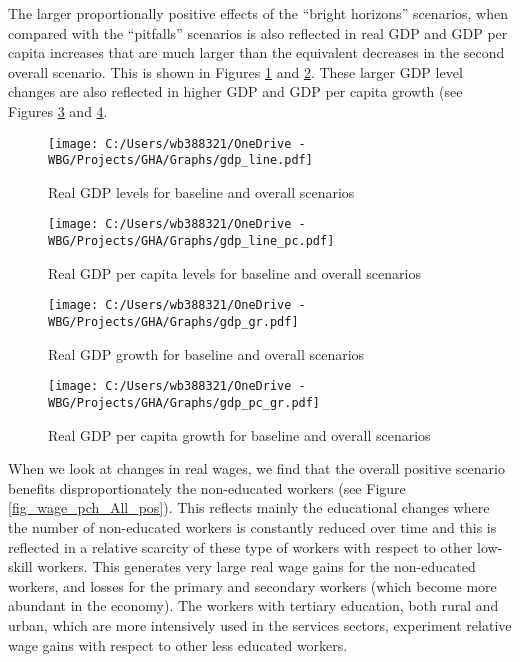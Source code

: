 \documentclass[11pt,english]{article}
\begin{document}
 \clearpage
 
 The larger proportionally positive effects of the ``bright horizons'' scenarios, when compared with the ``pitfalls'' scenarios is also reflected in real GDP and GDP per capita increases that are much larger than the equivalent decreases in the second overall scenario. This is shown in Figures \ref{fig_gdp_line} and \ref{fig_gdp_line_pc}. These larger GDP level changes are also reflected in higher GDP and GDP per capita growth  (see Figures \ref{fig_gdp_gr} and \ref{fig_gdp_pc_gr}.
 
 \begin{figure}[ht!]\caption{Real GDP levels for baseline and overall scenarios}  \label{fig_gdp_line}
	\centering
	\texttt{[image: C:/Users/wb388321/OneDrive - WBG/Projects/GHA/Graphs/gdp\_line.pdf]}
\end{figure}

\begin{figure}[ht!]\caption{Real GDP per capita levels for baseline and overall scenarios}\label{fig_gdp_line_pc}
	\centering
	\texttt{[image: C:/Users/wb388321/OneDrive - WBG/Projects/GHA/Graphs/gdp\_line\_pc.pdf]}
\end{figure}

\begin{figure}[ht!]\caption{Real GDP growth for baseline and overall scenarios}\label{fig_gdp_gr}
	\centering
	\texttt{[image: C:/Users/wb388321/OneDrive - WBG/Projects/GHA/Graphs/gdp\_gr.pdf]}
\end{figure}


\begin{figure}[ht!]\caption{Real GDP per capita growth for baseline and overall scenarios}\label{fig_gdp_pc_gr}
	\centering
	\texttt{[image: C:/Users/wb388321/OneDrive - WBG/Projects/GHA/Graphs/gdp\_pc\_gr.pdf]}
\end{figure}

\clearpage

When we look at changes in real wages, we find that the overall positive scenario benefits disproportionately the non-educated workers (see Figure \ref{fig_wage_pch_All_pos}). This reflects mainly the educational changes where the number of non-educated workers is constantly reduced over time and this is reflected in a relative scarcity of these type of workers with respect to other low-skill workers. This generates very large real wage gains for the non-educated workers, and losses for the primary and secondary workers (which become more abundant in the economy). The workers with tertiary education, both rural and urban, which are more intensively used in the services sectors, experiment relative wage gains with respect to other less educated workers. 
\end{document}
